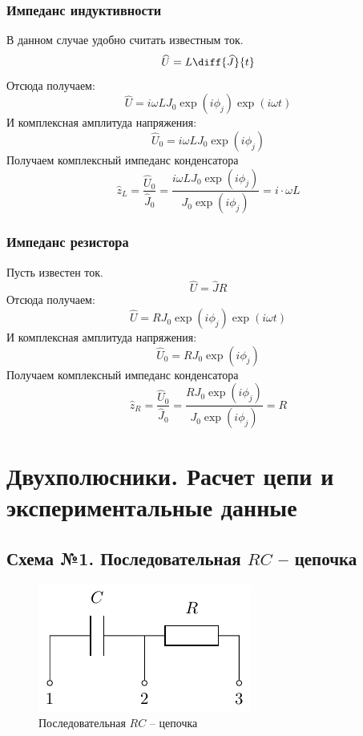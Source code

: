 \subsubsection{Импеданс индуктивности}

В данном случае удобно считать известным ток.
\begin{equation}
	\hat{U}=L\diff{\hat{J}}{t}
\end{equation}
Отсюда получаем:
\begin{equation}
	\hat{U}=i\omega L J_0\exp(i\phi_j)\exp(i\omega t)
\end{equation}
И комплексная амплитуда напряжения:
\begin{equation}
	\hat{U}_0=i\omega L J_0\exp(i\phi_j)
\end{equation}
Получаем комплексный импеданс конденсатора
\begin{equation}
	\hat{z}_L=\frac{\hat{U}_0}{\hat{J}_0}=\frac{i\omega L J_0\exp(i\phi_j)}{J_0\exp(i\phi_j)}=i\cdot \omega L
\end{equation}

\subsubsection{Импеданс резистора}

Пусть известен ток.
\begin{equation}
	\hat{U}=\hat{J}R
\end{equation}
Отсюда получаем:
\begin{equation}
	\hat{U}=R J_0\exp(i\phi_j)\exp(i\omega t)
\end{equation}
И комплексная амплитуда напряжения:
\begin{equation}
	\hat{U}_0=R J_0\exp(i\phi_j)
\end{equation}
Получаем комплексный импеданс конденсатора
\begin{equation}
	\hat{z}_R=\frac{\hat{U}_0}{\hat{J}_0}=\frac{R J_0\exp(i\phi_j)}{J_0\exp(i\phi_j)}=R
\end{equation}

\section{Двухполюсники. Расчет цепи и экспериментальные данные}
\subsection{Схема №1. Последовательная $RC$ -- цепочка}

\begin{figure}[H]
	\centering
	\includegraphics[]{chems/chem1}
	\caption{Последовательная $RC$ -- цепочка}
	\label{fig:RC}
\end{figure}

